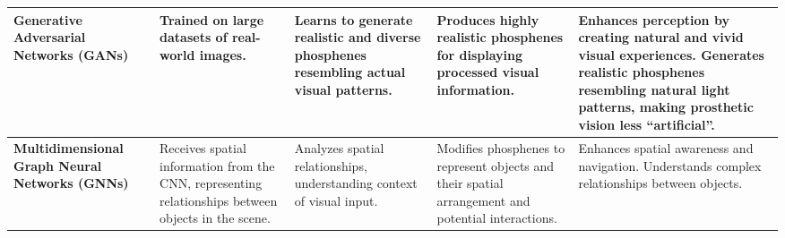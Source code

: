\documentclass[twocolumn,10pt]{article}
\begin{document}
\begin{table}[ht!]
\begin{tabularx}{\textwidth}{|X|X|X|X|X|}
            \textbf{Generative Adversarial Networks (GANs)}                                                                                                                                              &
            Trained on large datasets of real-world images.                                                                                                                                              &
            Learns to generate realistic and diverse phosphenes resembling actual visual patterns.                                                                                                       &
            Produces highly realistic phosphenes for displaying processed visual information.                                                                                                            &
            Enhances perception by creating natural and vivid visual
            experiences. Generates realistic phosphenes resembling natural light
            patterns, making prosthetic vision less ``artificial''.\
            \\ \hline

            \textbf{Multidimensional Graph Neural Networks (GNNs)}                                                                                                                                       &
            Receives spatial information from the CNN, representing relationships between objects in the scene.                                                                                          &
            Analyzes spatial relationships, understanding context of visual input.                                                                                                                       &
            Modifies phosphenes to represent objects and their spatial arrangement and potential interactions.                                                                                           &
            Enhances spatial awareness and navigation. Understands complex
            relationships between objects.\
            \\ \hline


\end{tabularx}
\end{table}
\end{document}
